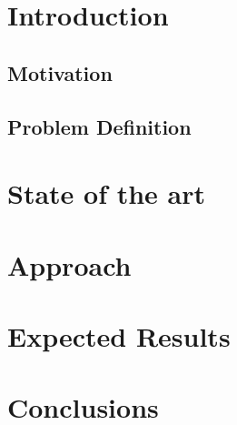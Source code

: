 \documentclass[english, oneside]{ist-thesis}
\begin{document}
\makecover

\tableofcontents
\clearpage

\mainstart


\section{Introduction}

\subsection{Motivation}


\subsection{Problem Definition}


\section{State of the art}


\section{Approach}

\section{Expected Results}

\section{Conclusions}







\nocite{latex-companion, fontcatalogue, latexwiki, ctan, texsx}


\printbibliography[heading = bibintoc]

\appendix
\end{document}
